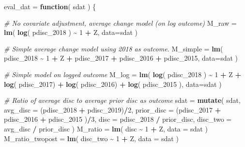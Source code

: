 \documentclass[
]{book}
\newenvironment{Shaded}{\begin{snugshade}}{\end{snugshade}}
\newcommand{\AttributeTok}[1]{\textcolor[rgb]{0.13,0.29,0.53}{#1}}
\newcommand{\CommentTok}[1]{\textcolor[rgb]{0.56,0.35,0.01}{\textit{#1}}}
\newcommand{\ControlFlowTok}[1]{\textcolor[rgb]{0.13,0.29,0.53}{\textbf{#1}}}
\newcommand{\DecValTok}[1]{\textcolor[rgb]{0.00,0.00,0.81}{#1}}
\newcommand{\FunctionTok}[1]{\textcolor[rgb]{0.13,0.29,0.53}{\textbf{#1}}}
\newcommand{\NormalTok}[1]{#1}
\newcommand{\OtherTok}[1]{\textcolor[rgb]{0.56,0.35,0.01}{#1}}
\newcommand{\SpecialCharTok}[1]{\textcolor[rgb]{0.81,0.36,0.00}{\textbf{#1}}}
\begin{document}
\begin{Shaded}
\begin{Highlighting}[]
\NormalTok{eval\_dat }\OtherTok{=} \ControlFlowTok{function}\NormalTok{( sdat ) \{}
    
    \CommentTok{\# No covariate adjustment, average change model (on log outcome)}
\NormalTok{    M\_raw }\OtherTok{=} \FunctionTok{lm}\NormalTok{( }\FunctionTok{log}\NormalTok{( pdisc\_2018 ) }\SpecialCharTok{\textasciitilde{}} \DecValTok{1} \SpecialCharTok{+}\NormalTok{ Z, }\AttributeTok{data=}\NormalTok{sdat )}

    \CommentTok{\# Simple average change model using 2018 as outcome.}
\NormalTok{    M\_simple }\OtherTok{=} \FunctionTok{lm}\NormalTok{( pdisc\_2018 }\SpecialCharTok{\textasciitilde{}} \DecValTok{1} \SpecialCharTok{+}\NormalTok{ Z }\SpecialCharTok{+}\NormalTok{ pdisc\_2017 }\SpecialCharTok{+}\NormalTok{ pdisc\_2016 }\SpecialCharTok{+}\NormalTok{ pdisc\_2015,}
                   \AttributeTok{data=}\NormalTok{sdat )}

    \CommentTok{\# Simple model on logged outcome}
\NormalTok{    M\_log }\OtherTok{=} \FunctionTok{lm}\NormalTok{( }\FunctionTok{log}\NormalTok{( pdisc\_2018 ) }\SpecialCharTok{\textasciitilde{}} \DecValTok{1} \SpecialCharTok{+}\NormalTok{ Z }\SpecialCharTok{+} \FunctionTok{log}\NormalTok{( pdisc\_2017) }\SpecialCharTok{+} \FunctionTok{log}\NormalTok{( pdisc\_2016) }\SpecialCharTok{+} \FunctionTok{log}\NormalTok{( pdisc\_2015 ),}
                \AttributeTok{data=}\NormalTok{sdat )}
    
    \CommentTok{\# Ratio of average disc to average prior disc as outcome}
\NormalTok{    sdat }\OtherTok{=} \FunctionTok{mutate}\NormalTok{( sdat,}
                   \AttributeTok{avg\_disc =}\NormalTok{ (pdisc\_2018 }\SpecialCharTok{+}\NormalTok{ pdisc\_2019)}\SpecialCharTok{/}\DecValTok{2}\NormalTok{,}
                   \AttributeTok{prior\_disc =}\NormalTok{ (pdisc\_2017 }\SpecialCharTok{+}\NormalTok{ pdisc\_2016 }\SpecialCharTok{+}\NormalTok{ pdisc\_2015 )}\SpecialCharTok{/}\DecValTok{3}\NormalTok{,}
                   \AttributeTok{disc =}\NormalTok{ pdisc\_2018 }\SpecialCharTok{/}\NormalTok{ prior\_disc,}
                   \AttributeTok{disc\_two =}\NormalTok{ avg\_disc }\SpecialCharTok{/}\NormalTok{ prior\_disc )}
\NormalTok{    M\_ratio }\OtherTok{=} \FunctionTok{lm}\NormalTok{( disc }\SpecialCharTok{\textasciitilde{}} \DecValTok{1} \SpecialCharTok{+}\NormalTok{ Z, }\AttributeTok{data =}\NormalTok{ sdat )}
\NormalTok{    M\_ratio\_twopost }\OtherTok{=} \FunctionTok{lm}\NormalTok{( disc\_two }\SpecialCharTok{\textasciitilde{}} \DecValTok{1} \SpecialCharTok{+}\NormalTok{ Z, }\AttributeTok{data =}\NormalTok{ sdat )}
    

\end{Highlighting}
\end{Shaded}
\end{document}

